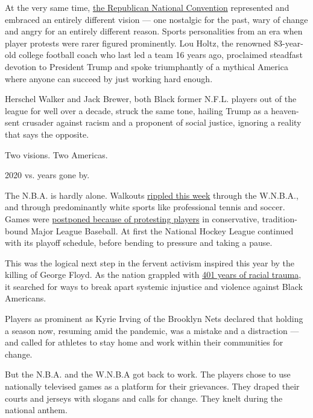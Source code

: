 At the very same time,
\href{https://www.nytimes3xbfgragh.onion/2020/08/27/us/politics/republican-national-convention-recap.html}{the
Republican National Convention} represented and embraced an entirely
different vision --- one nostalgic for the past, wary of change and
angry for an entirely different reason. Sports personalities from an era
when player protests were rarer figured prominently. Lou Holtz, the
renowned 83-year-old college football coach who last led a team 16 years
ago, proclaimed steadfast devotion to President Trump and spoke
triumphantly of a mythical America where anyone can succeed by just
working hard enough.

Herschel Walker and Jack Brewer, both Black former N.F.L. players out of
the league for well over a decade, struck the same tone, hailing Trump
as a heaven-sent crusader against racism and a proponent of social
justice, ignoring a reality that says the opposite.

Two visions. Two Americas.

2020 vs. years gone by.

The N.B.A. is hardly alone. Walkouts
\href{https://www.nytimes3xbfgragh.onion/2020/08/27/sports/basketball/nba-resume.html}{rippled
this week} through the W.N.B.A., and through predominantly white sports
like professional tennis and soccer. Games were
\href{https://www.nytimes3xbfgragh.onion/2020/08/27/us/difference-boycott-strike-nba.html}{postponed
because of protesting players} in conservative, tradition-bound Major
League Baseball. At first the National Hockey League continued with its
playoff schedule, before bending to pressure and taking a pause.

This was the logical next step in the fervent activism inspired this
year by the killing of George Floyd. As the nation grappled with
\href{https://www.nytimes3xbfgragh.onion/interactive/2019/08/14/magazine/1619-america-slavery.html}{401
years of racial trauma}, it searched for ways to break apart systemic
injustice and violence against Black Americans.

Players as prominent as Kyrie Irving of the Brooklyn Nets declared that
holding a season now, resuming amid the pandemic, was a mistake and a
distraction --- and called for athletes to stay home and work within
their communities for change.

But the N.B.A. and the W.N.B.A got back to work. The players chose to
use nationally televised games as a platform for their grievances. They
draped their courts and jerseys with slogans and calls for change. They
knelt during the national anthem.

